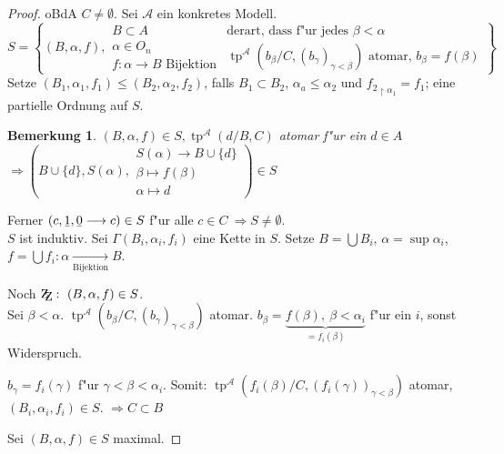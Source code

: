 \documentclass[a4paper,12pt,numbers=noenddot,parskip=full]{scrartcl}
\newcommand{\scrA}{\mathcal{A}}
\newcommand{\zz}{\mathrm{Z\kern-.3em\raise-0.5ex\hbox{Z}}:~}
\newcommand{\ubar}[1]{\text{\b{$#1$}}}
\DeclareMathOperator{\typ}{tp}
\theoremstyle{dotless}
\newtheorem{remark}[theorem]{Bemerkung}
\begin{document}
\begin{proof}
	oBdA $C \neq \emptyset$. Sei $\scrA$ ein konkretes Modell.
	\begin{equation*}
		S = \left\{(B, \alpha, f), \begin{array}{c}
			B \subset A\\ \alpha \in O_n\\ f: \alpha \rightarrow B \text{ Bijektion}
		\end{array} \begin{array}{c} \text{derart, dass f"ur jedes } \beta < \alpha\\ \typ^\scrA(b_\beta / C, (b_\gamma)_{\gamma < \beta}) \text{ atomar, } b_\beta=f(\beta) \end{array} \right\}
	\end{equation*}
	Setze $(B_1, \alpha_1, f_1) \leq (B_2, \alpha_2, f_2)$, falls $B_1 \subset B_2$, $\alpha_a \leq \alpha_2$ und ${f_2}_{\upharpoonright \alpha_1} = f_1$; eine partielle Ordnung auf $S$.
	\begin{remark}\label{hilf:bem}
		$(B, \alpha, f) \in S, \typ^\scrA(d/B, C)$ atomar f"ur ein $d \in A$ $\Longrightarrow \left(B \cup \{d\}, S(\alpha), \begin{array}{c}
			S(\alpha) \longrightarrow B \cup \{d\}\\ \beta \longmapsto f(\beta)\\ \alpha \longmapsto d
		\end{array}\right) {\in S}$
	\end{remark}
	Ferner $(c, \ubar{1}, \ubar{0} \longrightarrow c) \in S$ f"ur alle $c \in C~ \Longrightarrow S \neq \emptyset$.\\
	$S$ ist induktiv. Sei $\Gamma(B_i, \alpha_i, f_i)$ eine Kette in $S$. Setze $B = \bigcup B_i$, $\alpha = \sup \alpha_i$, \\$f= \bigcup f_i:\alpha \underset{\text{Bijektion}}{\longrightarrow} B$.
	
	Noch $\zz (B,\alpha,f) \in S$.\\
	Sei $\beta < \alpha$. $\typ^\scrA(b_\beta / C, (b_\gamma)_{\gamma < \beta})$ atomar. $b_\beta = \underbrace{f(\beta),~ \beta < \alpha_i}_{=f_i(\beta)}$ f"ur ein $i$, sonst Widerspruch.
	
	$b_\gamma = f_i(\gamma)$ f"ur $\gamma < \beta < \alpha_i$. Somit: $\typ^\scrA(f_i(\beta)/C,(f_i(\gamma))_{\gamma < \beta})$ atomar, $(B_i, \alpha_i, f_i) \in S$. $\Longrightarrow C \subset B$
	
	Sei $(B, \alpha, f) \in S$ maximal.
	

\end{proof}
\end{document}
